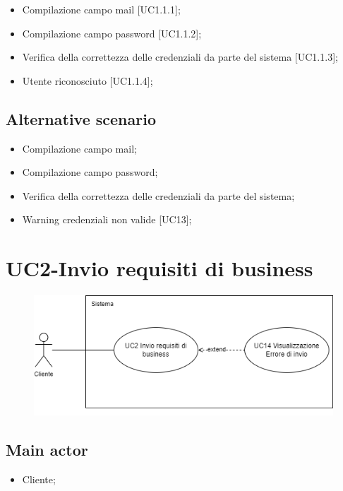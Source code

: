 \documentclass{article}
\begin{document}
        \begin{itemize}
            \item Compilazione campo mail [UC1.1.1];
            \item Compilazione campo password [UC1.1.2];
            \item Verifica della correttezza delle credenziali da parte del sistema [UC1.1.3];
            \item Utente riconosciuto [UC1.1.4];
        \end{itemize}
            
        \subsection*{Alternative scenario}
            \begin{itemize}
                \item Compilazione campo mail;
                \item Compilazione campo password;
                \item Verifica della correttezza delle credenziali da parte del sistema;
                \item Warning credenziali non valide [UC13];
            \end{itemize}
    
\section{UC2-Invio requisiti di business}
    \begin{figure}[h]
      \centering
      \includegraphics{./imgUML/UC2.png}
      \label{fig:immagine}
    \end{figure}
     \subsection*{Main actor}
     \begin{itemize}
         \item Cliente;
     \end{itemize}
\end{document}

